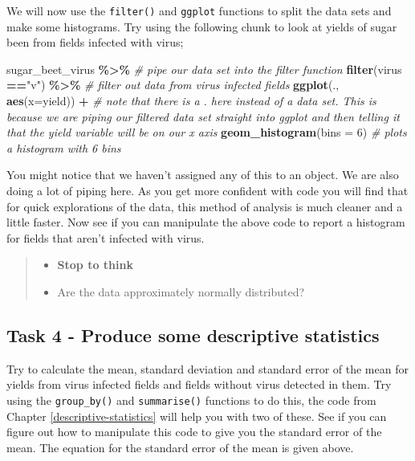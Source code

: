 \documentclass[
]{book}
\newenvironment{Shaded}{\begin{snugshade}}{\end{snugshade}}
\newcommand{\AttributeTok}[1]{\textcolor[rgb]{0.13,0.29,0.53}{#1}}
\newcommand{\CommentTok}[1]{\textcolor[rgb]{0.56,0.35,0.01}{\textit{#1}}}
\newcommand{\DecValTok}[1]{\textcolor[rgb]{0.00,0.00,0.81}{#1}}
\newcommand{\FunctionTok}[1]{\textcolor[rgb]{0.13,0.29,0.53}{\textbf{#1}}}
\newcommand{\NormalTok}[1]{#1}
\newcommand{\SpecialCharTok}[1]{\textcolor[rgb]{0.81,0.36,0.00}{\textbf{#1}}}
\newcommand{\StringTok}[1]{\textcolor[rgb]{0.31,0.60,0.02}{#1}}
\providecommand{\tightlist}{%
  \setlength{\itemsep}{0pt}\setlength{\parskip}{0pt}}
\begin{document}
We will now use the \texttt{filter()} and \texttt{ggplot} functions to split the data sets and make some histograms. Try using the following chunk to look at yields of sugar been from fields infected with virus;

\begin{Shaded}
\begin{Highlighting}[]
\NormalTok{sugar\_beet\_virus }\SpecialCharTok{\%\textgreater{}\%} \CommentTok{\# pipe our data set into the filter function}
  \FunctionTok{filter}\NormalTok{(virus }\SpecialCharTok{==}\StringTok{"v"}\NormalTok{) }\SpecialCharTok{\%\textgreater{}\%} \CommentTok{\# filter out data from virus infected fields}
  \FunctionTok{ggplot}\NormalTok{(., }\FunctionTok{aes}\NormalTok{(}\AttributeTok{x=}\NormalTok{yield)) }\SpecialCharTok{+} \CommentTok{\# note that there is a . here instead of a data set. This is because we are piping our filtered data set straight into ggplot and then telling it that the yield variable will be on our x axis}
  \FunctionTok{geom\_histogram}\NormalTok{(}\AttributeTok{bins =} \DecValTok{6}\NormalTok{) }\CommentTok{\# plots a histogram with 6 bins}
\end{Highlighting}
\end{Shaded}

You might notice that we haven't assigned any of this to an object. We are also doing a lot of piping here. As you get more confident with code you will find that for quick explorations of the data, this method of analysis is much cleaner and a little faster. Now see if you can manipulate the above code to report a histogram for fields that aren't infected with virus.

\begin{quote}
\begin{itemize}
\tightlist
\item
  \textbf{Stop to think}
\item
  Are the data approximately normally distributed?
\end{itemize}
\end{quote}

\subsection{Task 4 - Produce some descriptive statistics}\label{task-4---produce-some-descriptive-statistics}

Try to calculate the mean, standard deviation and standard error of the mean for yields from virus infected fields and fields without virus detected in them. Try using the \texttt{group\_by()} and \texttt{summarise()} functions to do this, the code from Chapter \ref{descriptive-statistics} will help you with two of these. See if you can figure out how to manipulate this code to give you the standard error of the mean. The equation for the standard error of the mean is given above.
\end{document}
